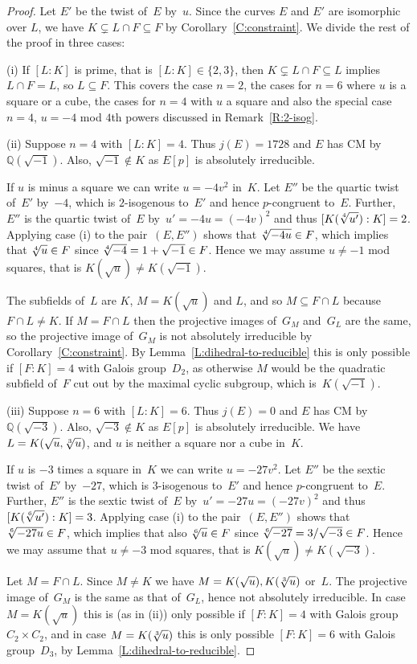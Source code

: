 \documentclass[12pt, reqno]{amsart}
\newcommand{\Q}{\mathbb{Q}}
\numberwithin{equation}{section}
\theoremstyle{definition}
\theoremstyle{remark}
\begin{document}
\begin{proof} 
Let $E'$ be the twist of~$E$ by~$u$.  Since the curves $E$ and $E'$
are isomorphic over $L$, we have $K\subsetneq L\cap F\subseteq F$ by
Corollary~\ref{C:constraint}.  We divide the rest of the proof in
three cases:

(i) If $[L : K]$ is prime, that is $[L : K] \in \{2, 3\}$, then
$K\subsetneq L\cap F\subseteq L$ implies $L\cap F=L$, so $L \subseteq
F$. This covers the case $n=2$, the cases for $n=6$ where $u$ is a
square or a cube, the cases for $n=4$ with $u$ a square and also the
special case $n=4$, $u=-4$ mod $4$th powers discussed in
Remark~\ref{R:2-isog}.

(ii) Suppose $n=4$ with $[L : K]=4$. Thus $j(E) = 1728$ and $E$ has CM
by~$\Q(\sqrt{-1})$. Also, $\sqrt{-1} \not\in K$ as $E[p]$ is
absolutely irreducible.

If $u$ is minus a square we can write $u=-4v^2$ in~$K$. Let $E''$ be the
quartic twist of~$E'$ by~$-4$, which is $2$-isogenous to~$E'$ and hence $p$-congruent
to~$E$. Further, $E''$ is the quartic twist of~$E$ by~$u' =  -4u = (-4v)^2$ and thus $[K(\root 4 \of {u'}) : K] = 2$.
Applying case (i)
to the pair~$(E,E'')$ shows that $\root4\of{-4u}\in F$, which implies
that $\root4\of{u}\in F$ since $\root4\of{-4}=1+\sqrt{-1}\in F$.
Hence we may assume $u \neq -1$ mod squares, that is $K(\sqrt{u}) \not= K(\sqrt{-1})$.

The subfields of~$L$ are $K$, $M=K(\sqrt{u})$ and $L$, and so $M
\subseteq F \cap L$ because $F \cap L \neq K$.  If $M=F\cap L$ then
the projective images of~$G_M$ and~$G_L$ are the same, so the
projective image of~$G_M$ is not absolutely irreducible by
Corollary~\ref{C:constraint}.  By Lemma~\ref{L:dihedral-to-reducible}
this is only possible if $[F:K]=4$ with Galois group~$D_2$, as
otherwise $M$ would be the quadratic subfield of~$F$ cut out by the
maximal cyclic subgroup, which is~$K(\sqrt{-1})$.

(iii) Suppose $n=6$ with $[L : K]=6$. Thus $j(E) = 0$ and $E$ has CM
by $\Q(\sqrt{-3})$. Also, $\sqrt{-3} \not\in K$ as $E[p]$ is
absolutely irreducible. We have $L = K(\sqrt{u},\root 3 \of u)$, and
$u$ is neither a square nor a cube in~$K$.

If $u$ is $-3$ times a square in~$K$ we can write $u=-27v^2$. Let
$E''$ be the sextic twist of~$E'$ by~$-27$, which is $3$-isogenous
to~$E'$ and hence $p$-congruent to~$E$.  Further, $E''$ is the sextic
twist of~$E$ by~$u' = -27u = (-27v)^2$ and thus $[K(\root 6 \of {u'})
  : K] = 3$.  Applying case (i) to the pair~$(E,E'')$ shows that
$\root6\of{-27u}\in F$, which implies that also $\root6\of{u}\in F$
since $\root6\of{-27}=3/\sqrt{-3}\in F$.  Hence we may assume that $u
\neq -3$ mod squares, that is $K(\sqrt{u}) \not= K(\sqrt{-3})$.

Let $M = F \cap L$.  Since $M\not=K$ we have $M = K(\sqrt{u}), K(\root
3 \of{u})$ or~$L$.  The projective image of~$G_M$ is the same as that
of~$G_L$, hence not absolutely irreducible.  In case $M=K(\sqrt{u})$
this is (as in (ii)) only possible if $[F:K]=4$ with Galois
group~$C_2\times C_2$, and in case $M=K(\root3\of{u})$ this is only
possible $[F:K]=6$ with Galois group~$D_3$, by
Lemma~\ref{L:dihedral-to-reducible}.
\end{proof}
\end{document}
